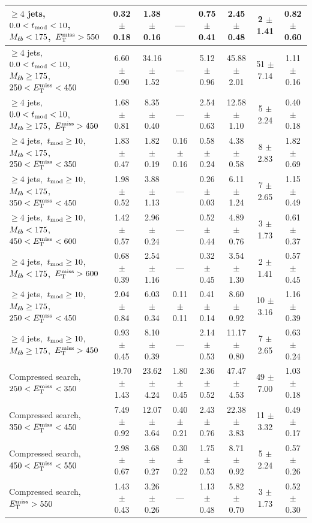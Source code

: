 \begin{table}
\begin{tabular}{|l|c c c c c|c|c|}
$\ge4$ jets,~$0.0< t_\text{mod} <10$,~$M_{\ell b}<175$,~$E_\text{T}^\text{miss}>550$      & 0.32 $\pm$ 0.18  & 1.38 $\pm$ 0.16   &       ---       & 0.75 $\pm$ 0.41  & 2.45 $\pm$ 0.48   & 2 $\pm$ 1.41    & 0.82 $\pm$ 0.60 \\
\hline
$\ge4$ jets,~$0.0< t_\text{mod} <10$,~$M_{\ell b}\ge175$,~$250<E_\text{T}^\text{miss}<450$& 6.60 $\pm$ 0.90  & 34.16 $\pm$ 1.52  &       ---       & 5.12 $\pm$ 0.96  & 45.88 $\pm$ 2.01  & 51 $\pm$ 7.14   & 1.11 $\pm$ 0.16 \\
$\ge4$ jets,~$0.0< t_\text{mod} <10$,~$M_{\ell b}\ge175$,~$E_\text{T}^\text{miss}>450$    & 1.68 $\pm$ 0.81  & 8.35 $\pm$ 0.40   &       ---       & 2.54 $\pm$ 0.63  & 12.58 $\pm$ 1.10  & 5 $\pm$ 2.24    & 0.40 $\pm$ 0.18 \\
\hline
$\ge4$ jets,~$t_\text{mod} \ge10$,~$M_{\ell b}<175$,~$250<E_\text{T}^\text{miss}<350$      & 1.83 $\pm$ 0.47  & 1.82 $\pm$ 0.19   & 0.16 $\pm$ 0.16 & 0.58 $\pm$ 0.24  & 4.38 $\pm$ 0.58   & 8 $\pm$ 2.83    & 1.82 $\pm$ 0.69 \\
$\ge4$ jets,~$t_\text{mod} \ge10$,~$M_{\ell b}<175$,~$350<E_\text{T}^\text{miss}<450$      & 1.98 $\pm$ 0.52  & 3.88 $\pm$ 1.13   &       ---       & 0.26 $\pm$ 0.03  & 6.11 $\pm$ 1.24   & 7 $\pm$ 2.65    & 1.15 $\pm$ 0.49 \\
$\ge4$ jets,~$t_\text{mod} \ge10$,~$M_{\ell b}<175$,~$450<E_\text{T}^\text{miss}<600$      & 1.42 $\pm$ 0.57  & 2.96 $\pm$ 0.24   &       ---       & 0.52 $\pm$ 0.44  & 4.89 $\pm$ 0.76   & 3 $\pm$ 1.73    & 0.61 $\pm$ 0.37 \\
$\ge4$ jets,~$t_\text{mod} \ge10$,~$M_{\ell b}<175$,~$E_\text{T}^\text{miss}>600$          & 0.68 $\pm$ 0.39  & 2.54 $\pm$ 1.16   &       ---       & 0.32 $\pm$ 0.45  & 3.54 $\pm$ 1.30   & 2 $\pm$ 1.41    & 0.57 $\pm$ 0.45 \\
\hline
$\ge4$ jets,~$t_\text{mod} \ge10$,~$M_{\ell b}\ge175$,~$250<E_\text{T}^\text{miss}<450$    & 2.04 $\pm$ 0.84  & 6.03 $\pm$ 0.34   & 0.11 $\pm$ 0.11 & 0.41 $\pm$ 0.14  & 8.60 $\pm$ 0.92   & 10 $\pm$ 3.16   & 1.16 $\pm$ 0.39 \\
$\ge4$ jets,~$t_\text{mod} \ge10$,~$M_{\ell b}\ge175$,~$E_\text{T}^\text{miss}>450$        & 0.93 $\pm$ 0.45  & 8.10 $\pm$ 0.39   &       ---       & 2.14 $\pm$ 0.53  & 11.17 $\pm$ 0.80  & 7 $\pm$ 2.65    & 0.63 $\pm$ 0.24 \\
\hline
Compressed search, $250<E_\text{T}^\text{miss}<350$  & 19.70 $\pm$ 1.43  & 23.62 $\pm$ 4.24  & 1.80 $\pm$ 0.45  & 2.36 $\pm$ 0.52  & 47.47 $\pm$ 4.53  & 49 $\pm$ 7.00  & 1.03 $\pm$ 0.18 \\*
Compressed search, $350<E_\text{T}^\text{miss}<450$  & 7.49 $\pm$ 0.92  & 12.07 $\pm$ 3.64  & 0.40 $\pm$ 0.21  & 2.43 $\pm$ 0.76  & 22.38 $\pm$ 3.83  & 11 $\pm$ 3.32  & 0.49 $\pm$ 0.17 \\*
Compressed search, $450<E_\text{T}^\text{miss}<550$  & 2.98 $\pm$ 0.67  & 3.68 $\pm$ 0.27  & 0.30 $\pm$ 0.22  & 1.75 $\pm$ 0.53  & 8.71 $\pm$ 0.92  & 5 $\pm$ 2.24  & 0.57 $\pm$ 0.26 \\*
Compressed search, $E_\text{T}^\text{miss}>550$      & 1.43 $\pm$ 0.43  & 3.26 $\pm$ 0.26  & ---  & 1.13 $\pm$ 0.48  & 5.82 $\pm$ 0.70  & 3 $\pm$ 1.73  & 0.52 $\pm$ 0.30 \\*
\hline
\end{tabular}
\end{table}

